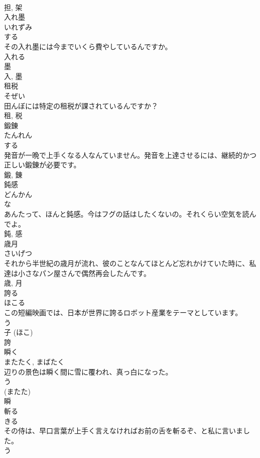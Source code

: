 \documentclass[8pt]{extreport}
\begin{document}
\begin{CJK}{UTF8}{min}
\\	担, 架	
\\	入れ墨	
\\	いれずみ	
\\	する 
\\	その入れ墨には今までいくら費やしているんですか。	
\\	入れる 
\\	墨 
\\	入, 墨	
\\	租税	
\\	そぜい	
\\	田んぼには特定の租税が課されているんですか？	
\\	租, 税	
\\	鍛錬	
\\	たんれん	
\\	する 
\\	発音が一晩で上手くなる人なんていません。発音を上達させるには、継続的かつ正しい鍛錬が必要です。	
\\	鍛, 錬	
\\	鈍感	
\\	どんかん	
\\	な 
\\	あんたって、ほんと鈍感。今はフグの話はしたくないの。それくらい空気を読んでよ。	
\\	鈍, 感	
\\	歳月	
\\	さいげつ	
\\	それから半世紀の歳月が流れ、彼のことなんてほとんど忘れかけていた時に、私達は小さなパン屋さんで偶然再会したんです。	
\\	歳, 月	
\\	誇る	
\\	ほこる	
\\	この短編映画では、日本が世界に誇るロボット産業をテーマとしています。	
\\	う 
\\	子 (ほこ) 
\\	誇	
\\	瞬く	
\\	またたく, まばたく	
\\	辺りの景色は瞬く間に雪に覆われ、真っ白になった。	
\\	う 
\\	(またた) 
\\	瞬	
\\	斬る	
\\	きる	
\\	その侍は、早口言葉が上手く言えなければお前の舌を斬るぞ、と私に言いました。	
\\	う 

\end{CJK}
\end{document}
